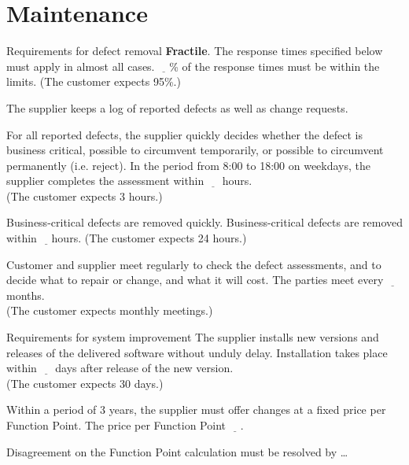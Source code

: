 \documentclass[Main]{subfiles}
\begin{document}
\section{Maintenance}

\begin{DynTable}{Requirements for defect removal}
{\textbf{Fractile}. The response times specified below must apply in almost all cases.}
{$\underline{\quad}$\% of the response times must be within the limits. 
(The customer expects 95\%.)}
{}


{The supplier keeps a log of reported defects as well as change requests.}
{}
{}

{For all reported defects, the supplier quickly decides whether the defect is business critical, possible to circumvent temporarily, or possible to circumvent permanently (i.e. reject).}
{In the period from 8:00 to 18:00 on weekdays, the supplier completes the assessment within $\underline{\quad}$ hours. \\
(The customer expects 3 hours.)}
{}

{Business-critical defects are removed quickly. }
{Business-critical defects are removed within $\underline{\quad}$hours. 
(The customer expects 24 hours.)}
{}

{Customer and supplier meet regularly to check the defect assessments, and to decide what to repair or change, and what it will cost.}
{The parties meet every $\underline{\quad}$ months.\\
(The customer expects monthly meetings.)}
{}


\end{DynTable}

\begin{DynTable}{Requirements for system improvement}
{The supplier installs new versions and releases of the delivered software without unduly delay.}
{Installation takes place within $\underline{\quad}$ days after release of the new version.\\
(The customer expects 30 days.)}
{}

{Within a period of 3 years, the supplier must offer changes at a fixed price per Function Point.}
{The price per Function Point $\underline{\quad}$.}
{}

{Disagreement on the Function Point calculation must be resolved by}
{\dots}
{}

\end{DynTable}
\end{document}
